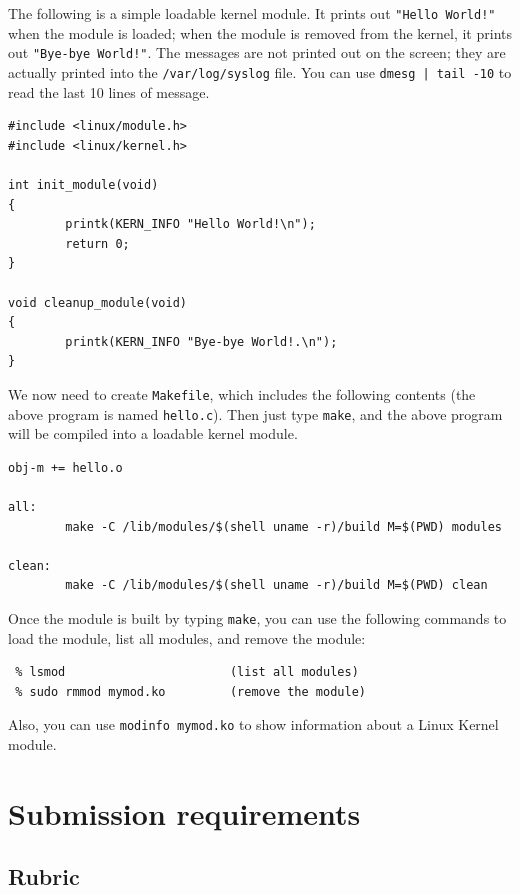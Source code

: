 The following is a simple loadable kernel module. It prints out 
{\tt "Hello World!"} when the module is loaded; when the module
is removed from the kernel, it prints out {\tt "Bye-bye World!"}.
The messages are not printed out on the screen; they are 
actually printed into the {\tt /var/log/syslog} file. You can
use {\tt dmesg | tail -10} to read the last 10 lines of message.

\begin{Verbatim}[frame=single] 
#include <linux/module.h>
#include <linux/kernel.h>

int init_module(void)
{
        printk(KERN_INFO "Hello World!\n");
        return 0;
}

void cleanup_module(void)
{
        printk(KERN_INFO "Bye-bye World!.\n");
}
\end{Verbatim}

\noindent
We now need to create {\tt Makefile}, which includes the following
contents (the above program is named {\tt hello.c}). Then 
just type {\tt make}, and the above program will be compiled
into a loadable kernel module.


\begin{Verbatim}[frame=single] 
obj-m += hello.o

all:
        make -C /lib/modules/$(shell uname -r)/build M=$(PWD) modules

clean:
        make -C /lib/modules/$(shell uname -r)/build M=$(PWD) clean
\end{Verbatim} 



\noindent
Once the module is built by typing {\tt make}, you can use the following commands to 
load the module, list all modules, and remove the module:

\begin{Verbatim}[frame=single] 
 % sudo insmod mymod.ko        (inserting a module)
 % lsmod                       (list all modules)
 % sudo rmmod mymod.ko         (remove the module)
\end{Verbatim} 

Also, you can use {\tt modinfo mymod.ko} to show information about a 
Linux Kernel module.
\fi


\section{Submission requirements}
\subsection{Rubric}

